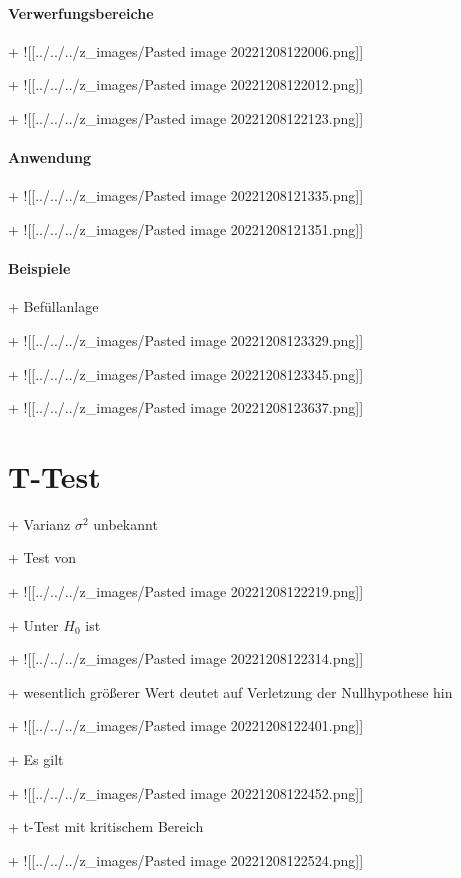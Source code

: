 \documentclass[10pt]{report}
\begin{document}
\subsubsection{Verwerfungsbereiche}

+ ![[../../../z\_images/Pasted image 20221208122006.png]]

+ ![[../../../z\_images/Pasted image 20221208122012.png]]

+ ![[../../../z\_images/Pasted image 20221208122123.png]]


\subsubsection{Anwendung}

+ ![[../../../z\_images/Pasted image 20221208121335.png]]

+ ![[../../../z\_images/Pasted image 20221208121351.png]]


\subsubsection{Beispiele}

+ Befüllanlage

+ ![[../../../z\_images/Pasted image 20221208123329.png]]

+ ![[../../../z\_images/Pasted image 20221208123345.png]]

+ ![[../../../z\_images/Pasted image 20221208123637.png]]
\chapter{T-Test}\label{ch:T-Test}

+ Varianz $\sigma^2$ unbekannt

+ Test von

+ ![[../../../z\_images/Pasted image 20221208122219.png]]

+ Unter $H_0$ ist

+ ![[../../../z\_images/Pasted image 20221208122314.png]]

+ wesentlich größerer Wert deutet auf Verletzung der Nullhypothese hin

+ ![[../../../z\_images/Pasted image 20221208122401.png]]

+ Es gilt

+ ![[../../../z\_images/Pasted image 20221208122452.png]]

+ t-Test mit kritischem Bereich

+ ![[../../../z\_images/Pasted image 20221208122524.png]]
\end{document}
